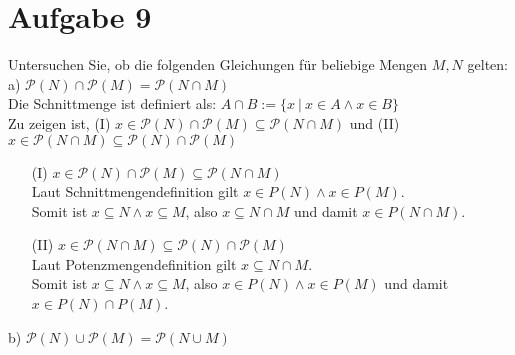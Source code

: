 \section*{Aufgabe 9}

Untersuchen Sie, ob die folgenden Gleichungen für beliebige Mengen $M, N$ gelten:\\

a) $\mathcal{P}(N) \cap \mathcal{P}(M) = \mathcal{P}(N \cap M)$\\

Die Schnittmenge ist definiert als: $A \cap B := \{x \ | \ x \in A \land x \in B \}$\\

Zu zeigen ist, (I) $x \in \mathcal{P}(N) \cap \mathcal{P}(M) \subseteq \mathcal{P}(N \cap M)$ und (II) $x \in \mathcal{P}(N \cap M) \subseteq \mathcal{P}(N) \cap \mathcal{P}(M)$

\begin{enumerate}[leftmargin=2em]
\item[(I)] $x \in \mathcal{P}(N) \cap \mathcal{P}(M) \subseteq \mathcal{P}(N \cap M)$\\
Laut Schnittmengendefinition gilt $x \in P(N) \land x \in P(M)$.\\
Somit ist $x \subseteq N \land x \subseteq M$, also $x \subseteq N \cap M$ und damit $x \in P(N \cap M)$.
\item[(II)] $x \in \mathcal{P}(N \cap M) \subseteq \mathcal{P}(N) \cap \mathcal{P}(M)$\\
Laut Potenzmengendefinition gilt $x \subseteq N \cap M$.\\
Somit ist $x \subseteq N \land x \subseteq M$, also $x \in P(N) \land x \in P(M)$ und damit $x \in P(N) \cap P(M)$.
\end{enumerate}

b) $\mathcal{P}(N) \cup \mathcal{P}(M) = \mathcal{P}(N \cup M)$\\

\newpage